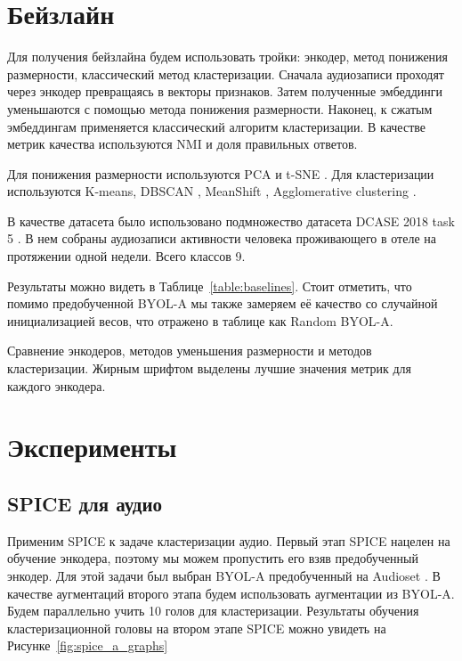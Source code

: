 \documentclass[a4paper,12pt]{extarticle}
\begin{document}
\section{Бейзлайн}

Для получения бейзлайна будем использовать тройки: 
энкодер, метод понижения размерности, классический 
метод кластеризации. Сначала аудиозаписи проходят 
через энкодер превращаясь в векторы признаков. 
Затем полученные эмбеддинги уменьшаются с помощью метода
понижения размерности. Наконец, к сжатым эмбеддингам 
применяется классический алгоритм кластеризации. 
В качестве метрик качества используются NMI и доля 
правильных ответов.

Для понижения размерности используются PCA \cite{PCA_overview} и 
t-SNE \cite{JMLR:v9:vandermaaten08a}. Для кластеризации 
используются K-means, DBSCAN \cite{ester1996density}, 
MeanShift \cite{fukunaga1975estimation}, Agglomerative 
clustering \cite{agglomerative}.

В качестве датасета было использовано подмножество 
датасета DCASE 2018 task 5 \cite{dcase2018_task5}.
В нем собраны аудиозаписи активности человека проживающего в 
отеле на протяжении одной недели. Всего классов 9. 

Результаты можно видеть в Таблице~\ref{table:baselines}. 
Стоит отметить, что помимо предобученной BYOL-A мы 
также замеряем её качество со случайной инициализацией 
весов, что отражено в таблице как Random BYOL-A.
\begin{table}[]
    \footnotesize
	\centering

	\caption{Сравнение энкодеров, методов уменьшения размерности и методов кластеризации.
	Жирным шрифтом выделены лучшие значения метрик для каждого энкодера.}
	\label{table:baselines}
\end{table}

\section{Эксперименты}

\subsection{SPICE для аудио}

    Применим SPICE к задаче кластеризации аудио. 
    Первый этап SPICE нацелен на обучение энкодера, поэтому 
    мы можем пропустить его взяв предобученный энкодер. Для 
    этой задачи был выбран BYOL-A предобученный на Audioset \cite{audioset}. 
    В качестве аугментаций второго этапа будем использовать аугментации из 
    BYOL-A. Будем параллельно учить 10 голов для кластеризации. 
    Результаты обучения кластеризационной головы на втором этапе 
    SPICE можно увидеть на Рисунке~\ref{fig:spice_a_graphs}
\end{document}
